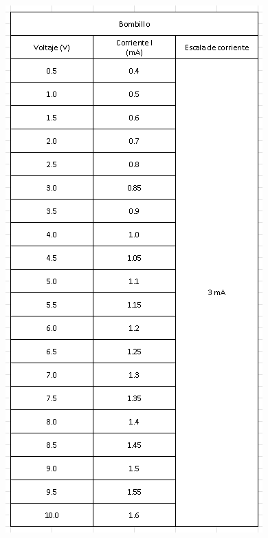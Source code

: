 \documentclass[10pt]{article}
\begin{document}
\begin{multicols}{2}
	\begin{figure}[H]
		\includegraphics[scale = .58]{./Images/Table2.png}
	\end{figure}

\end{multicols}
\end{document}
